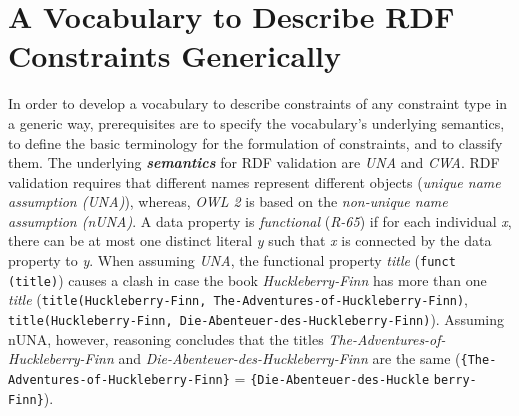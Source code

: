 \documentclass{llncs}
\newcommand{\ms}[1]{\texttt{#1}}
\begin{document}
\section{A Vocabulary to Describe RDF Constraints Generically} 
\label{sec:vocabulary}

In order to develop a vocabulary to describe constraints of any constraint type in a generic way, prerequisites are to specify the vocabulary's underlying semantics, to define the basic terminology for the formulation of constraints, and to classify them. 
The underlying \textbf{\emph{semantics}} for RDF validation are \emph{UNA} and \emph{CWA}.
RDF validation requires that different names represent different objects ({\em unique name assumption (UNA)}), whereas,
\emph{OWL 2} is based on the {\em non-unique name assumption (nUNA)}. 
A data property is \emph{functional} (\emph{R-65}) if for each individual \emph{x}, there can be at most one distinct literal \emph{y} such that \emph{x} is connected by the data property to \emph{y}.
When assuming \emph{UNA}, the functional property {\em title} (\ms{funct (title)}) causes a clash
in case the book {\em Huckleberry-Finn} has more than one \emph{title}
(\ms{title(Huckleberry-Finn, The-Adventures-of-Huckleberry-Finn)}, \ms{title(Huckleberry-Finn, Die-Abenteuer-des-Huckleberry-Finn)}).
Assuming nUNA, however, reasoning concludes that the titles {\em The-Adventures-of-Huckleberry-Finn} and {\em Die-Abenteuer-des-Huckleberry-Finn} are the same (\ms{\{The-Adventures-of-Huckleberry-Finn\}} = \ms{\{Die-Abenteuer-des-Huckle} \ms{berry-}\ms{Finn\}}).  
\end{document}

